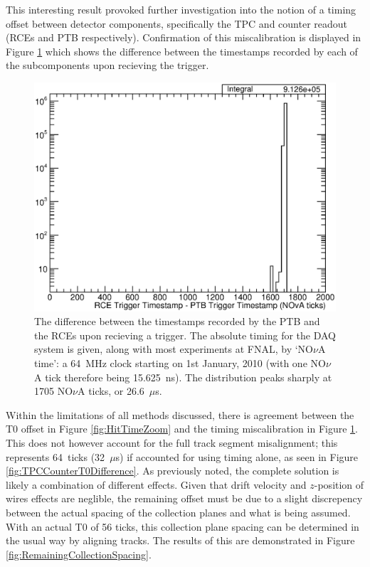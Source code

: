This interesting result provoked further investigation into the notion of a timing offset between detector components, specifically the TPC and counter readout (RCEs and PTB respectively).  Confirmation of this miscalibration is displayed in Figure \ref{fig:TPCCounterOffset} which shows the difference between the timestamps recorded by each of the subcomponents upon recieving the trigger.

\begin{figure}[tb]
  \centering
  \includegraphics[width=12cm]{PTBRCEDiffTimestamps.eps}
  \caption[The difference between the timestamps recorded by the PTB and the RCEs upon recieving a trigger.]{The difference between the timestamps recorded by the PTB and the RCEs upon recieving a trigger.  The absolute timing for the DAQ system is given, along with most experiments at FNAL, by `NO$\nu$A time': a 64~MHz clock starting on 1st January, 2010 (with one NO$\nu$A tick therefore being 15.625~ns).  The distribution peaks sharply at 1705 NO$\nu$A ticks, or 26.6~$\mu$s.}
  \label{fig:TPCCounterOffset}
\end{figure}

Within the limitations of all methods discussed, there is agreement between the T0 offset in Figure \ref{fig:HitTimeZoom} and the timing miscalibration in Figure \ref{fig:TPCCounterOffset}.  This does not however account for the full track segment misalignment; this represents 64~ticks (32~$\mu$s) if accounted for using timing alone, as seen in Figure \ref{fig:TPCCounterT0Difference}.  As previously noted, the complete solution is likely a combination of different effects.  Given that drift velocity and $z$-position of wires effects are neglible, the remaining offset must be due to a slight discrepency between the actual spacing of the collection planes and what is being assumed.  With an actual T0 of 56 ticks, this collection plane spacing can be determined in the usual way by aligning tracks.  The results of this are demonstrated in Figure \ref{fig:RemainingCollectionSpacing}.

